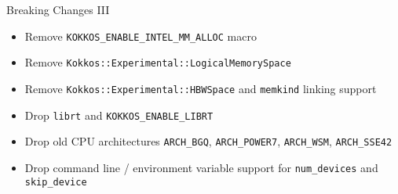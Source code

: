 
\begin{frame}[fragile]{Breaking Changes III}

\begin{itemize}
\item Remove \texttt{KOKKOS\_ENABLE\_INTEL\_MM\_ALLOC} macro
\item Remove \texttt{Kokkos::Experimental::LogicalMemorySpace}
\item Remove \texttt{Kokkos::Experimental::HBWSpace} and \texttt{memkind} linking support
\item Drop \texttt{librt} and \texttt{KOKKOS\_ENABLE\_LIBRT}
\item Drop old CPU architectures \texttt{ARCH\_BGQ}, \texttt{ARCH\_POWER7}, \texttt{ARCH\_WSM},  \texttt{ARCH\_SSE42}
\item Drop command line / environment variable support for \texttt{num\_devices} and \texttt{skip\_device}
\end{itemize}


\end{frame}

